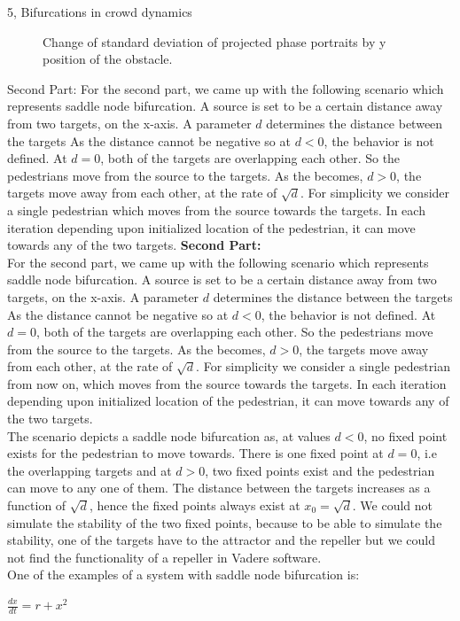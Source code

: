 \documentclass[10pt,a4paper]{article}
\begin{document}
\begin{task}{5, Bifurcations in crowd dynamics}
\begin{figure}[H]
\caption{Change of standard deviation of projected phase portraits by y position of the obstacle.}
\label{task5_std_change}
\end{figure}
\bigbreak
Second Part:
For the second part, we came up with the following scenario which represents saddle node bifurcation. A source is set to be a certain distance away from two targets, on the x-axis. A parameter $d$ determines the distance between the targets As the distance cannot be negative so at $d < 0$, the behavior is not defined. At $d=0$, both of the targets are overlapping each other. So the pedestrians move from the source to the targets. As the becomes, $d > 0$, the targets move away from each other, at the rate of $\sqrt{d}$. For simplicity we consider a single pedestrian which moves from the source towards the targets. In each iteration depending upon initialized location of the pedestrian, it can move towards any of the two targets.
\textbf{Second Part:} \\
For the second part, we came up with the following scenario which represents saddle node bifurcation. A source is set to be a certain distance away from two targets, on the x-axis. A parameter $d$ determines the distance between the targets As the distance cannot be negative so at $d < 0$, the behavior is not defined. At $d=0$, both of the targets are overlapping each other. So the pedestrians move from the source to the targets. As the becomes, $d > 0$, the targets move away from each other, at the rate of $\sqrt{d}$. For simplicity we consider a single pedestrian from now on, which moves from the source towards the targets. In each iteration depending upon initialized location of the pedestrian, it can move towards any of the two targets.\\

The scenario depicts a saddle node bifurcation as, at values $d < 0$, no fixed point exists for the pedestrian to move towards. There is one fixed point at $d = 0$, i.e the overlapping targets and at $d > 0$, two fixed points exist and the pedestrian can move to any one of them. The distance between the targets increases as a function of $\sqrt{d}$, hence the fixed points always exist at $x_{0}=\sqrt{d}$. We could not simulate the stability of the two fixed points, because to be able to simulate the stability, one of the targets have to the attractor and the repeller but we could not find the functionality of a repeller in Vadere software. \\

One of the examples of a system with saddle node bifurcation is: \\
\begin{center}
$\frac{dx}{dt} = r + x^{2}$
\end{center}


\end{task}
\end{document}

